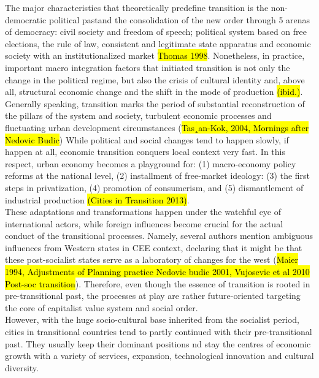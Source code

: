 \documentclass[11pt]{report}
\begin{document}
The major characteristics that theoretically predefine transition is the non-democratic political past\footnotemark and the consolidation of the new order through 5 arenas of democracy:
civil society and freedom of speech; political system based on free elections, the rule of law, consistent and legitimate state apparatus and economic society with an institutionalized market \hl{Thomas 1998}.
Nonetheless, in practice, important macro integration factors that initiated transition is not only the change in the political regime, but also the crisis of cultural identity and, above all, structural economic change and the shift in the mode of production \hl{(ibid.)}.
\\
Generally speaking, transition marks the period of substantial reconstruction of the pillars of the system and society, turbulent economic processes and fluctuating  urban development circumstances (\hl{Tas¸an-Kok, 2004, Mornings after Nedovic Budic})
While political and social changes tend to happen slowly, if happen at all, economic transition conquers local context very fast. 
In this respect, urban economy becomes a playground for: (1) macro-economy policy reforms at the national level, (2) installment of free-market ideology: (3) the first steps in privatization, (4) promotion of consumerism, and (5) dismantlement of industrial production \hl{(Cities in Transition 2013)}.
\\
These adaptations and transformations happen under the watchful eye of international actors, while foreign influences become crucial for the actual conduct of the transitional processes.
Namely, several authors mention ambiguous influences from Western states in CEE context, declaring that it might be that these post-socialist states serve as  a laboratory of changes for the west (\hl{Maier 1994, Adjustments of Planning practice Nedovic budic 2001, Vujosevic et al 2010 Post-soc transition}).
Therefore, even though the essence of transition is rooted in pre-transitional past, the processes at play are rather future-oriented targeting the core of capitalist value system and social order.
\\
However, with the huge socio-cultural base inherited from the socialist period, cities in transitional countries tend to partly continued with their pre-transitional past. They usually keep their dominant positions nd stay the centres of economic growth  with  a  variety  of  services,  expansion,  technological  innovation  and  cultural  diversity. 
\end{document}
